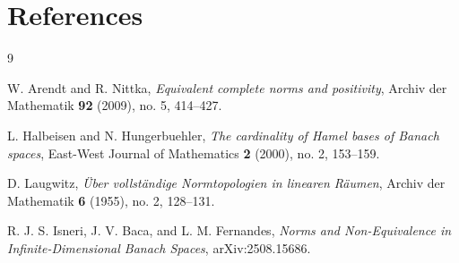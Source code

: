 \documentclass[11pt]{article}
\begin{document}
\section*{References}

\begin{thebibliography}{9}

W. Arendt and R. Nittka,
\emph{Equivalent complete norms and positivity},
Archiv der Mathematik \textbf{92} (2009), no. 5, 414--427.

L. Halbeisen and N. Hungerbuehler,
\emph{The cardinality of Hamel bases of Banach spaces},
East-West Journal of Mathematics \textbf{2} (2000), no. 2, 153--159.

D. Laugwitz,
\emph{\"Uber vollst\"andige Normtopologien in linearen R\"aumen},
Archiv der Mathematik \textbf{6} (1955), no. 2, 128--131.

R. J. S. Isneri, J. V. Baca, and L. M. Fernandes,
\emph{Norms and Non-Equivalence in Infinite-Dimensional Banach Spaces},
arXiv:2508.15686.

\end{thebibliography}
\end{document}
